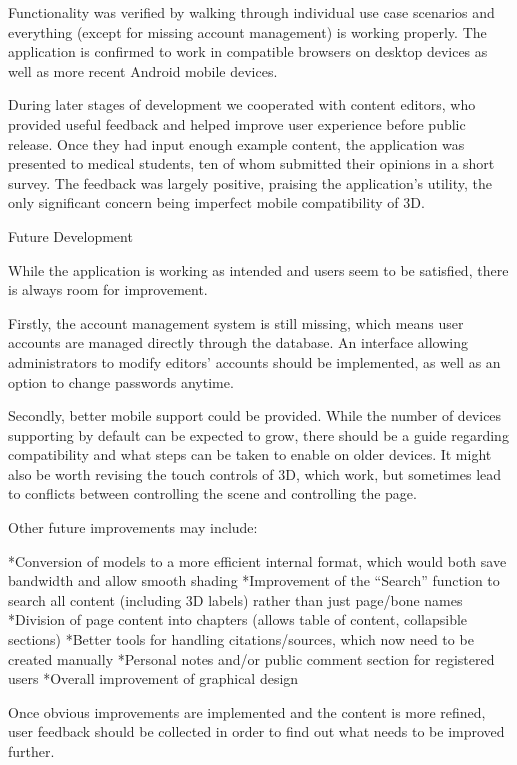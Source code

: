 Functionality was verified by walking through individual use case scenarios and everything (except for missing account management) is working properly. The application is confirmed to work in  compatible browsers on desktop devices as well as more recent Android mobile devices.

During later stages of development we cooperated with content editors, who provided useful feedback and helped improve user experience before public release. Once they had input enough example content, the application was presented to medical students, ten of whom submitted their opinions in a short survey. The feedback was largely positive, praising the application’s utility, the only significant concern being imperfect mobile compatibility of 3D.

\sec Future Development

While the application is working as intended and users seem to be satisfied, there is always room for improvement.

Firstly, the account management system is still missing, which means user accounts are managed directly through the database. An interface allowing administrators to modify editors’ accounts should be implemented, as well as an option to change passwords anytime.

Secondly, better mobile support could be provided. While the number of devices supporting  by default can be expected to grow, there should be a guide regarding compatibility and what steps can be taken to enable  on older devices. It might also be worth revising the touch controls of 3D, which work, but sometimes lead to conflicts between controlling the scene and controlling the page.

Other future improvements may include:

\begitems
*Conversion of models to a more efficient internal format, which would both save bandwidth and allow smooth shading
*Improvement of the “Search” function to search all content (including 3D labels) rather than just page/bone names
*Division of page content into chapters (allows table of content, collapsible sections)
*Better tools for handling citations/sources, which now need to be created manually
*Personal notes and/or public comment section for registered users
*Overall improvement of graphical design
\enditems

Once obvious improvements are implemented and the content is more refined, user feedback should be collected in order to find out what needs to be improved further.
